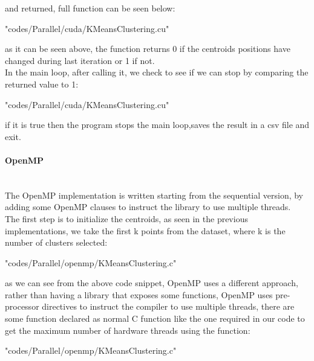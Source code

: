 \documentclass[10pt,twocolumn,letterpaper]{article}
\newcommand{\nlparagraph}[1]{\paragraph{#1}\mbox{}\\}
\begin{document}
and returned, full function can be seen below:\\
\begin{lstinputlisting}[language=C,style=CSnippetStyle,caption=CUDA Exit Condition Kernel Launcher,firstline=115,lastline=130]{
	"codes/Parallel/cuda/KMeansClustering.cu"}
\end{lstinputlisting}
as it can be seen above, the function returns 0 if the centroids positions have changed during last iteration or 1 if not.\\
In the main loop, after calling it, we check to see if we can stop by comparing the returned value to 1:\\
\begin{lstinputlisting}[language=C,style=CSnippetStyle,caption=CUDA Exit Condition,firstline=289,lastline=292]{
	"codes/Parallel/cuda/KMeansClustering.cu"}
\end{lstinputlisting}
if it is true then the program stops the main loop,saves the result in a csv file and exit.\\
\nlparagraph{OpenMP}
The OpenMP implementation is written starting from the sequential version, by adding some OpenMP clauses to instruct the library to use
multiple threads.\\
The first step is to initialize the centroids, as seen in the previous implementations, we take the first k points from the 
dataset, where k is the number of clusters selected:\\

\begin{lstinputlisting}[language=C,style=CSnippetStyle,caption=OpenMP Centroid Initialization,firstline=19,lastline=24]{
	"codes/Parallel/openmp/KMeansClustering.c"}
\end{lstinputlisting}

as we can see from the above code snippet, OpenMP uses a different approach, rather than having a library that exposes some 
functions, OpenMP uses pre-processor directives to instruct the compiler to use multiple threads, there are some function 
declared as normal C function like the one required in our code to get the maximum number of hardware threads using the 
function:\\

\begin{lstinputlisting}[language=C,style=CSnippetStyle,caption=OpenMP Get Max Number of Threads Function,firstline=17,lastline=17]{"codes/Parallel/openmp/KMeansClustering.c"}
\end{lstinputlisting}
\end{document}
